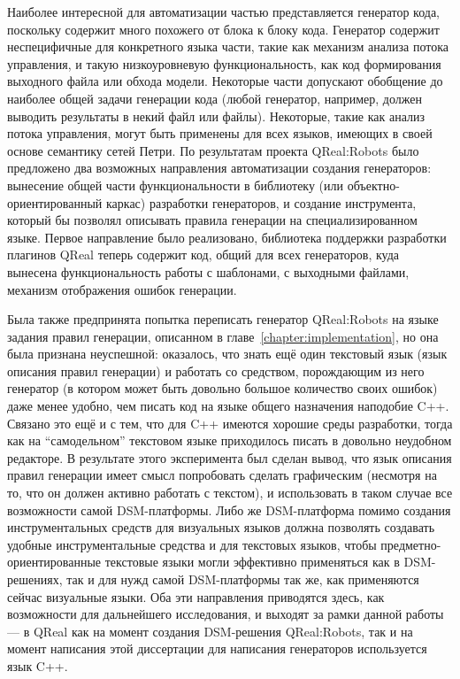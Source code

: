 Наиболее интересной для автоматизации частью представляется генератор кода, поскольку 
содержит много похожего от блока к блоку кода. Генератор содержит неспецифичные для 
конкретного языка части, такие как механизм анализа потока управления, и такую низкоуровневую 
функциональность, как код формирования выходного файла или обхода модели. Некоторые 
части допускают обобщение до наиболее общей задачи генерации кода (любой генератор, 
например, должен выводить результаты в некий файл или файлы). Некоторые, такие как 
анализ потока управления, могут быть применены для всех языков, имеющих в своей основе 
семантику сетей Петри. По результатам проекта QReal:Robots было предложено два возможных 
направления автоматизации создания генераторов: вынесение общей части функциональности 
в библиотеку (или объектно-ориентированный каркас) разработки генераторов, и создание 
инструмента, который бы позволял описывать правила генерации на специализированном 
языке.  Первое направление было реализовано, библиотека поддержки разработки плагинов 
QReal теперь содержит код, общий для всех генераторов, куда вынесена функциональность 
работы с шаблонами, с выходными файлами, механизм отображения ошибок генерации. 

Была также предпринята попытка переписать генератор QReal:Robots на языке задания 
правил генерации, описанном в главе~\ref{chapter:implementation}, но она была признана 
неуспешной: оказалось, что знать ещё один текстовый язык (язык описания правил генерации) 
и работать со средством, порождающим из него генератор (в котором может быть довольно 
большое количество своих ошибок) даже менее удобно, чем писать код на языке общего 
назначения наподобие C++. Связано это ещё и с тем, что для C++ имеются хорошие среды 
разработки, тогда как на "`самодельном"' текстовом языке приходилось писать в довольно 
неудобном редакторе. В результате этого эксперимента был сделан вывод, что язык описания 
правил генерации имеет смысл попробовать сделать графическим (несмотря на то, что 
он должен активно работать с текстом), и использовать в таком случае все возможности 
самой DSM-платформы. Либо же DSM-платформа помимо создания инструментальных средств 
для визуальных языков должна позволять создавать удобные инструментальные средства 
и для текстовых языков, чтобы предметно-ориентированные текстовые языки могли эффективно 
применяться как в DSM-решениях, так и для нужд самой DSM-платформы так же, как применяются 
сейчас визуальные языки. Оба эти направления приводятся здесь, как возможности для 
дальнейшего исследования, и выходят за рамки данной работы --- в QReal как на момент 
создания DSM-решения QReal:Robots, так и на момент написания этой диссертации для 
написания генераторов используется язык C++.

